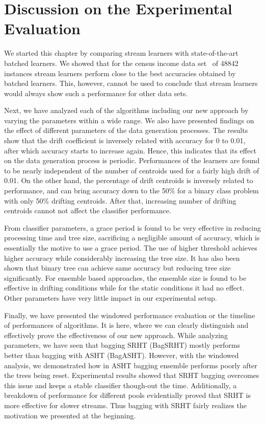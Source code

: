 \section{Discussion on the Experimental Evaluation}
We started this chapter by comparing stream learners with state-of-the-art batched learners. We showed that for the census income data set~\cite{ron:adultds} of 48842 instances stream learners perform close to the best accuracies obtained by batched learners. This, however, cannot be used to conclude that stream learners would always show such a performance for other data sets.

Next, we have analyzed each of the algorithms including our new approach by varying the parameters within a wide range. We also have presented findings on the effect of different parameters of the data generation processes. The results show that the drift coefficient is inversely related with accuracy for 0 to 0.01, after which accuracy starts to increase again. Hence, this indicates that its effect on the data generation process is periodic. Performances of the learners are found to be nearly independent of the number of centroids used for a fairly high drift of 0.01. On the other hand, the percentage of drift centroids is inversely related to performance, and can bring accuracy down to the 50\% for a binary class problem with only 50\% drifting centroids. After that, increasing number of drifting centroids cannot not affect the classifier performance. 

From classifier parameters, a grace period is found to be very effective in reducing processing time and tree size, sacrificing a negligible amount of accuracy, which is essentially the motive to use a grace period. The use of higher threshold achieves higher accuracy while considerably increasing the tree size. It has also been shown that binary tree can achieve same accuracy but reducing tree size significantly. For ensemble based approaches, the ensemble size is found to be effective in drifting conditions while for the static conditions it had no effect. Other parameters have very little impact in our experimental setup.

Finally, we have presented the windowed performance evaluation or the timeline of performances of algorithms. It is here, where we can clearly distinguish and effectively prove the effectiveness of our new approach. While analyzing parameters, we have seen that bagging SRHT (BagSRHT) mostly performs better than bagging with ASHT (BagASHT). However, with the windowed analysis, we demonstrated how in ASHT bagging ensemble performs poorly after the trees being reset. Experimental results showed that SRHT bagging overcomes this issue and keeps a stable classifier though-out the time. Additionally, a breakdown of performance for different pools evidentially proved that SRHT is more effective for slower streams. Thus bagging with SRHT fairly realizes the motivation we presented at the beginning.
